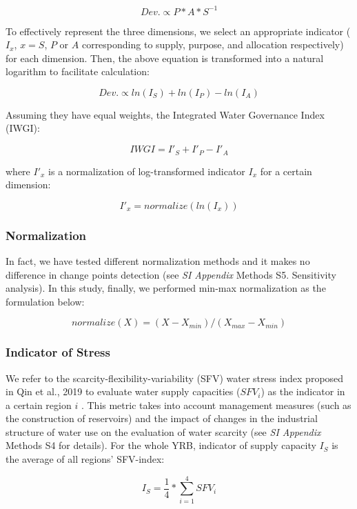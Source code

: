 \documentclass[9pt, twocolumn, twoside, lineno]{pnas-new}
\begin{document}
{	$$ Dev. \propto P*A*S^{-1}$$

	To effectively represent the three dimensions, we select an appropriate indicator ($I_x$, $x=S$, $P$ or $A$ corresponding to supply, purpose, and allocation respectively) for each dimension. Then, the above equation is transformed into a natural logarithm to facilitate calculation:

	$$ Dev. \propto ln(I_S) + ln(I_P) - ln(I_A) $$

	Assuming they have equal weights, the Integrated Water Governance Index (IWGI):

	$$ IWGI = I'_S + I'_P - I'_A $$

	where $I'_x$ is a normalization of log-transformed indicator $I_x$ for a certain dimension:

	$$ I'_x = normalize(ln(I_x)) $$
	
	\subsubsection*{Normalization}
	In fact, we have tested different normalization methods and it makes no difference in change points detection (see \textit{SI Appendix} Methods S5. Sensitivity analysis). In this study, finally, we performed min-max normalization as the formulation below:

	$$ normalize(X) = (X - X_{min}) / (X_{max} - X_{min}) $$

	\subsubsection*{Indicator of Stress}
	We refer to the scarcity-flexibility-variability (SFV) water stress index proposed in Qin et al., 2019 to evaluate water supply capacities ($SFV_i$) as the indicator in a certain region $i$ \cite{qin2019}. This metric takes into account management measures (such as the construction of reservoirs) and the impact of changes in the industrial structure of water use on the evaluation of water scarcity (see \textit{SI Appendix} Methods S4 for details). For the whole YRB, indicator of supply capacity $I_S$ is the average of all regions' SFV-index: 

	$$ I_S = \frac{1}{4} * \sum_{i=1}^4 SFV_{i} $$
	
}
\end{document}
